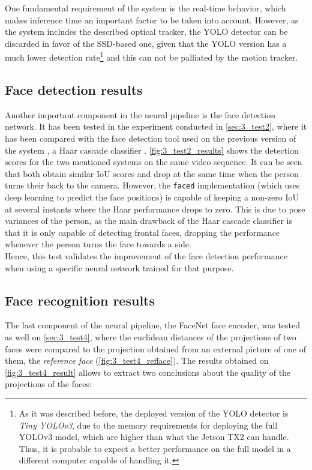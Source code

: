 One fundamental requirement of the system is the real-time behavior, which makes inference time an important factor to be taken into account. However, as the system includes the described optical tracker, the YOLO detector can be discarded in favor of the SSD-based one, given that the YOLO version has a much lower detection rate\footnote{As it was described before, the deployed version of the YOLO detector is \textit{Tiny YOLOv3}, due to the memory requirements for deploying the full YOLOv3 model, which are higher than what the Jetson TX2 can handle. Thus, it is probable to expect a better performance on the full model in a different computer capable of handling it.} and this can not be palliated by the motion tracker.\\

\subsection{Face detection results}
Another important component in the neural pipeline is the face detection network. It has been tested in the experiment conducted in \autoref{sec:3_test2}, where it has been compared with the face detection tool used on the previous version of the system \cite{tfg}, a Haar cascade classifier \cite{violajones}. \autoref{fig:3_test2_results} shows the detection scores for the two mentioned systems on the same video sequence. It can be seen that both obtain similar IoU scores and drop at the same time when the person turns their back to the camera. However, the \texttt{faced} implementation (which uses deep learning to predict the face positions) is capable of keeping a non-zero IoU at several instants where the Haar performance drops to zero. This is due to pose variances of the person, as the main drawback of the Haar cascade classifier is that it is only capable of detecting frontal faces, dropping the performance whenever the person turns the face towards a side.\\

Hence, this test validates the improvement of the face detection performance when using a specific neural network trained for that purpose.

\subsection{Face recognition results}
The last component of the neural pipeline, the FaceNet face encoder, was tested as well on \autoref{sec:3_test4}, where the euclidean distances of the projections of two faces were compared to the projection obtained from an external picture of one of them, the \textit{reference face} (\autoref{fig:3_test4_refface}). The results obtained on \autoref{fig:3_test4_result} allows to extract two conclusions about the quality of the projections of the faces:

